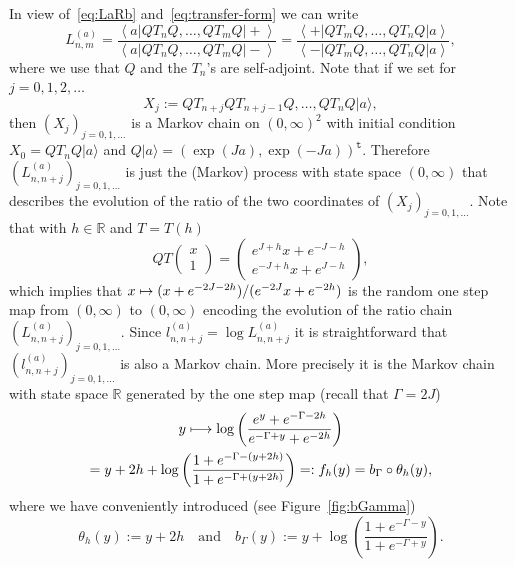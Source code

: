 \documentclass[10pt]{amsart}
\theoremstyle{definition}\newtheorem{defi}[theo]{Definition}\newtheorem{rema}[theo]{Remark}\newtheorem{exam}[theo]{Example}\newtheorem{exem}[theo]{Example}\newtheorem{nota}[theo]{Notation}
\newcommand{\bbR}{\mathbb{R}}
\newcommand{\gG}{\Gamma}
\newcommand{\ttt}{\mathtt{t}}
\newcommand{\tsp}{\ttt}
\let\oldmapsto\mapsto
\renewcommand*{\mapsto}{\mathchoice{\longmapsto}{\oldmapsto}{\oldmapsto}{\oldmapsto}}
\begin{document}
In view of~\eqref{eq:LaRb} and~\eqref{eq:transfer-form} we can write
\begin{equation}\label{eq:LaRb-2.1}
L_{n,m}^{(a)}= \frac {\left\langle a \left| Q T_n Q,\dots, Q T_{m} Q \right | + \right \rangle} {\left\langle a \left| Q T_n Q,\dots, Q T_{m} Q \right | - \right \rangle}
= \frac {\left\langle + \left| Q T_m Q,\dots, Q T_{n} Q \right| a \right\rangle} {\left\langle - \left| Q T_m Q,\dots, Q T_{n} Q \right| a \right\rangle},
\end{equation}
where we use that $Q$ and the $T_n$'s are self-adjoint. Note that if we set for $j=0, 1,2, \dots$
\begin{equation}
X_j:= Q T_{n+j} Q T_{n+j-1} Q,\dots, Q T_{n} Q | a\rangle,
\end{equation}
then $(X_j)_{j=0,1, \dots}$ is a Markov chain on $(0, \infty)^2$ { with initial condition $X_0 = Q T_n Q | a\rangle$ and $Q | a\rangle= (\exp(Ja),\exp(-Ja))^{\tsp}$.} Therefore $(L_{n, n+j}^{(a)})_{j=0,1,\dots}$ is just the (Markov) process with state space $(0, \infty)$ that describes the evolution of the ratio of the two coordinates of $(X_j)_{j=0,1, \dots}$. Note that with $h\in\bbR$ and $T=T(h)$
\begin{equation}\label{eq:1-step.0}
QT
\begin{pmatrix}
x \\ 1
\end{pmatrix}=
\begin{pmatrix}
e^{J+h}x +e^{-J-h}\\
e^{-J+h}x + e^{J-h}
\end{pmatrix},
\end{equation}
which implies that $x \mapsto(x+ e^{-2J-2h})/(e^{-2J} x+ e^{-2h})$ is the random one step map from $(0, \infty)$ to $(0, \infty)$ encoding the evolution of the ratio chain $(L_{n, n+j}^{(a)})_{j=0,1, \dots}$. Since $l_{n, n+j}^{(a)}= \log L_{n, n+j}^{(a)}$ it is straightforward that $(l_{n, n+j}^{(a)})_{j=0,1, \dots}$ is also a Markov chain. More precisely it is the Markov chain with state space $\bbR$ generated by the one step map (recall that $\gG= 2J$)
\begin{multline}\label{eq:f_h}
y \mapsto \log \left(\frac{e^y+e^{-\gG -2h}}{e^{-\gG +y} + e^{-2h}} \right)\\
= y+ 2h+ \log \left(\frac{1+e^{-\gG-(y+2h)}}{1+e^{-\gG +(y+2h)}} \right) =:
 f_h(y) = b_\gG \circ \theta_h (y),
\end{multline}
where we have conveniently introduced (see Figure~\ref{fig:bGamma})
\begin{equation}
\theta_h(y):= y+2h\quad\text{and}\quad b_\gG(y):= y+ \log \left(\frac{1+e^{-\gG-y}}{1+e^{-\gG +y}} \right).
\end{equation}
\end{document}
